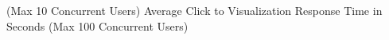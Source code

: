 (Max 10 Concurrent Users) Average Click to Visualization Response Time in Seconds (Max 100 Concurrent Users)